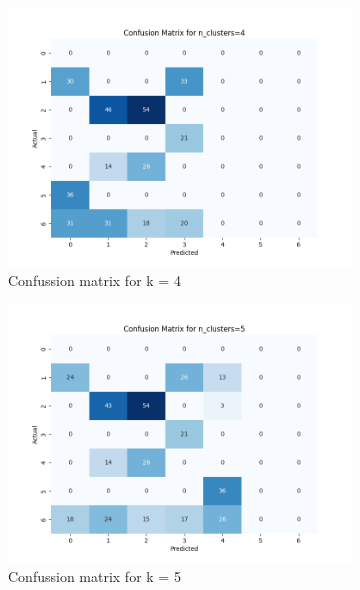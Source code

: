 \documentclass[12pt]{report}
\begin{document}
	\begin{figure}[H]
		\centering
		\begin{subfigure}{.6\textwidth}
			\centering
			\includegraphics[width=.9\linewidth]{../K-means/Output/Dataset1/confusionMatrix_k=4.png}
			\caption{Confussion matrix for k = 4}
			\label{Dataset1ConfusionMatrixk4}
		\end{subfigure}%
		\begin{subfigure}{.6\textwidth}
			\centering
			\includegraphics[width=.9\linewidth]{../K-means/Output/Dataset1/confusionMatrix_k=5.png}
			\caption{Confussion matrix for k = 5}
			\label{Dataset1ConfusionMatrixk5}
		\end{subfigure}
		\begin{subfigure}{.6\textwidth}%
			\centering

\end{subfigure}
\end{figure}
\end{document}
